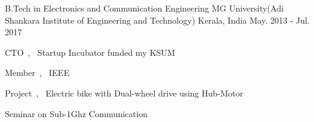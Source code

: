 

\begin{cventries}

  \cventry
    {B.Tech in Electronics and Communication Engineering} %
    {MG University(Adi Shankara Institute of Engineering and Technology)} %
    {Kerala, India} %
    {May. 2013 - Jul. 2017} %
    {
      \begin{cvitems} %
        \item {CTO~,~ Startup Incubator funded my KSUM}
        \item {Member~,~ IEEE}
        \item {Project~,~ Electric bike with Dual-wheel drive using Hub-Motor } 
        \item {Seminar on Sub-1Ghz Communication}  
    \end{cvitems}
    }

\end{cventries}

